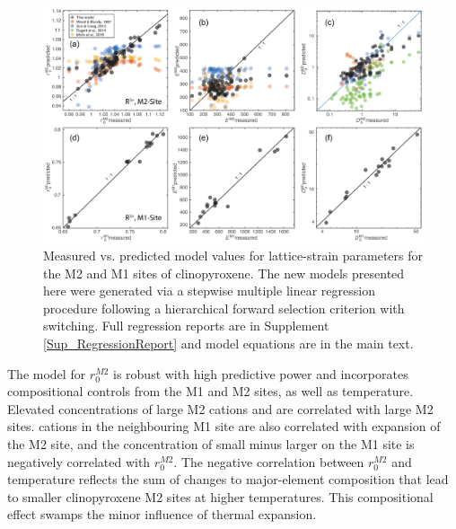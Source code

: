 \documentclass[review,authoryear,12pt]{elsarticle}
\begin{document}
	   
        \begin{figure}
        \begin{center}
        \includegraphics[width=1\textwidth]{12_StepwiseMultilinear_M1M2_24Oct2017.eps}
        \caption[Measured vs. predicted model values for lattice-strain parameters for the M2 and M1 sites of clinopyroxene]{Measured vs. predicted model values for lattice-strain parameters for the M2 and M1 sites of clinopyroxene. The new models presented here were generated via a stepwise multiple linear regression procedure following a hierarchical forward selection criterion with switching. Full regression reports are in Supplement \ref{Sup_RegressionReport} and model equations are in the main text.
        }
        \label{12_MLModel}
        \end{center}
        \end{figure}

	   

The model for $r_0^{M2}$ is robust with high predictive power and incorporates compositional controls from the M1 and M2 sites, as well as temperature. Elevated concentrations of large M2 cations  and  are correlated with large M2 sites.  cations in the neighbouring M1 site are also correlated with expansion of the M2 site, and the concentration of small  minus larger  on the M1 site is negatively correlated with $r_0^{M2}$. The negative correlation between $r_0^{M2}$ and temperature reflects the sum of changes to major-element composition that lead to smaller clinopyroxene M2 sites at higher temperatures. This compositional effect swamps the minor influence of thermal expansion.
\end{document}
